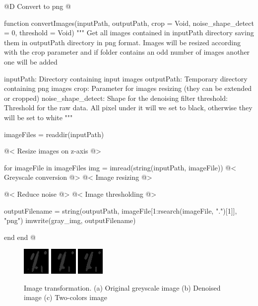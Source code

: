 \documentclass[11pt,oneside]{article}	%
\begin{document}
@D Convert to png
@{function convertImages(inputPath, outputPath,
                       crop = Void, noise_shape_detect = 0, threshold = Void)
  """
  Get all images contained in inputPath directory
  saving them in outputPath directory in png format.
  Images will be resized according with the crop parameter
  and if folder contains an odd number of images another one will be
  added

  inputPath: Directory containing input images
  outputPath: Temporary directory containing png images
  crop: Parameter for images resizing (they can be
        extended or cropped)
  noise_shape_detect: Shape for the denoising filter
  threshold: Threshold for the raw data. All pixel under it
             will we set to black, otherwise they will be set to white
  """

  imageFiles = readdir(inputPath)
  
  @< Resize images on z-axis @>
  
  for imageFile in imageFiles
    img = imread(string(inputPath, imageFile))
    @< Greyscale conversion @>
    @< Image resizing @>
    
    @< Reduce noise @>
    @< Image thresholding @>
    
   outputFilename = string(outputPath, imageFile[1:rsearch(imageFile, ".")[1]], "png")
   imwrite(gray_img, outputFilename)

  end
end
@}

\begin{figure}[htb] %
   \centering
   \includegraphics[width=0.30\linewidth]{images/grayscalesample.png} \hfill
   \includegraphics[width=0.30\linewidth]{images/denoised.png} \hfill
   \includegraphics[width=0.30\linewidth]{images/quantized.png} \hfill
   \caption{Image transformation. (a) Original greyscale image (b) Denoised image (c) Two-colors image}
   \label{fig:imageTransformation}
\end{figure}
\end{document}
